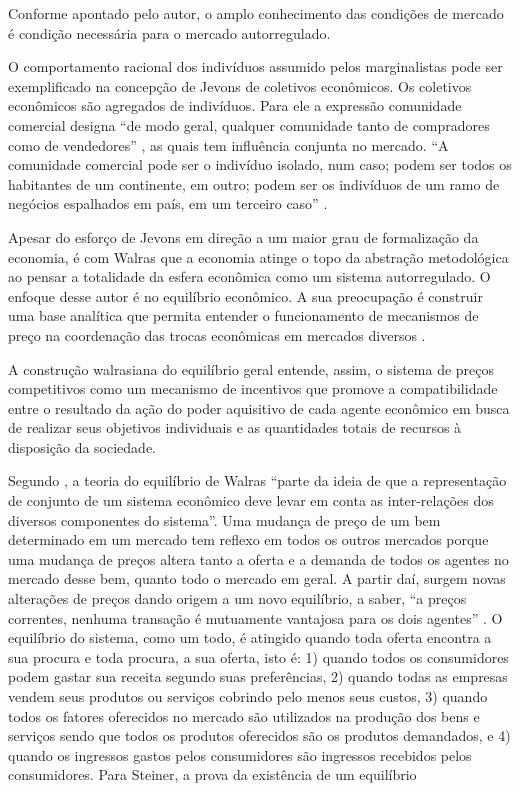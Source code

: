 \documentclass[a4paper, 12pt, openright, oneside, german, french, english, brazil]{abntex2}
\begin{document}
	Conforme apontado pelo autor, o amplo conhecimento das condições de mercado é condição necessária para o mercado autorregulado.
	
	O comportamento racional dos indivíduos assumido pelos marginalistas pode ser exemplificado na concepção de Jevons de coletivos econômicos. Os coletivos econômicos são agregados de indivíduos. Para ele a expressão comunidade comercial designa ``de modo geral, qualquer comunidade tanto de compradores como de vendedores'' \cite[p. 99]{jevons1996teoria}, as quais tem influência conjunta no mercado. ``A comunidade comercial pode ser o indivíduo isolado, num caso; podem ser todos os habitantes de um continente, em outro; podem ser os indivíduos de um ramo de negócios espalhados em país, em um terceiro caso'' \cite[p. 99]{jevons1996teoria}.
	
	Apesar do esforço de Jevons em direção a um maior grau de formalização da economia, é com Walras que a economia atinge o topo da abstração metodológica ao pensar a totalidade da esfera econômica como um sistema autorregulado. O enfoque desse autor é no equilíbrio econômico. A sua preocupação é construir uma base analítica que permita entender o funcionamento de mecanismos de preço na coordenação das trocas econômicas em mercados diversos \cite{carneiro1996apresentacao}.
	
	\begin{citacao}
		A construção walrasiana do equilíbrio geral entende, assim, o sistema de preços competitivos como um mecanismo de incentivos que promove a compatibilidade entre o resultado da ação do poder aquisitivo de cada agente econômico em busca de realizar seus objetivos individuais e as quantidades totais de recursos à disposição da sociedade. \cite[p. 12]{carneiro1996apresentacao}
	\end{citacao}
	
	Segundo , a teoria do equilíbrio de Walras ``parte da ideia de que a representação de conjunto de um sistema econômico deve levar em conta as inter-relações dos diversos componentes do sistema''. Uma mudança de preço de um bem determinado em um mercado tem reflexo em todos os outros mercados porque uma mudança de preços altera tanto a oferta e a demanda de todos os agentes no mercado desse bem, quanto todo o mercado em geral. A partir daí, surgem novas alterações de preços dando origem a um novo equilíbrio, a saber, ``a preços correntes, nenhuma transação é mutuamente vantajosa para os dois agentes'' \cite[p. 38]{steiner2006}. O equilíbrio do sistema, como um todo, é atingido quando toda oferta encontra a sua procura e toda procura, a sua oferta, isto é: 1) quando todos os consumidores podem gastar sua receita segundo suas preferências, 2) quando todas as empresas vendem seus produtos ou serviços cobrindo pelo menos seus custos, 3) quando todos os fatores oferecidos no mercado são utilizados na produção dos bens e serviços sendo que todos os produtos oferecidos são os produtos demandados, e 4) quando os ingressos gastos pelos consumidores são ingressos recebidos pelos consumidores. Para Steiner, a prova da existência de um equilíbrio
	
\end{document}
